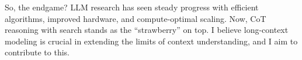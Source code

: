 So, the endgame?
%
LLM research has seen steady progress with efficient algorithms, improved hardware, and compute-optimal scaling.
%
Now, CoT reasoning with search stands as the ``strawberry'' on top.
%
I believe long-context modeling is crucial in extending the limits of context understanding, and I aim to contribute to this.
